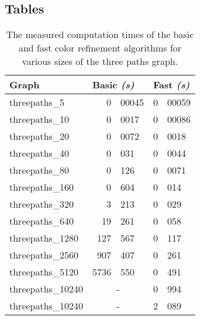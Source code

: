 \documentclass[twoside]{article}
\begin{document}
\begin{appendices}
\section{Tables} %
\label{app:tabs}
\begin{table}[h]\centering
\begin{tabular}{|l|r@{.}l|r@{.}l|}
\hline
Graph	
	& \multicolumn{2}{l|}{Basic \emph{(s)}}
	& \multicolumn{2}{l|}{Fast \emph{(s)}} \\
\hline
threepaths\_{}5
	& 0 & 00045
	& 0	& 00059 \\
threepaths\_{}10
	& 0 & 0017
	& 0	& 00086 \\
threepaths\_{}20
	& 0 & 0072
	& 0	& 0018 \\
threepaths\_{}40
	& 0 & 031
	& 0	& 0044 \\
threepaths\_{}80
	& 0 & 126
	& 0	& 0071 \\
threepaths\_{}160
	& 0 & 604
	& 0	& 014 \\
threepaths\_{}320
	& 3 & 213
	& 0	& 029 \\
threepaths\_{}640
	& 19 & 261
	& 0	& 058 \\
threepaths\_{}1280
	& 127 & 567
	& 0	& 117 \\
threepaths\_{}2560
	& 907 & 407
	& 0	& 261 \\
threepaths\_{}5120
	& 5736 & 550
	& 0	& 491 \\
threepaths\_{}10240
	& \multicolumn{2}{c|}{-}
	& 0	& 994 \\
threepaths\_{}10240
	& \multicolumn{2}{c|}{-}
	& 2	& 089 \\

\hline
\end{tabular}
\caption{The measured computation times of the basic and fast color refinement algorithms for various sizes of the three paths graph.}
\label{table:measurements}
\end{table}

\end{appendices}
\end{document}
